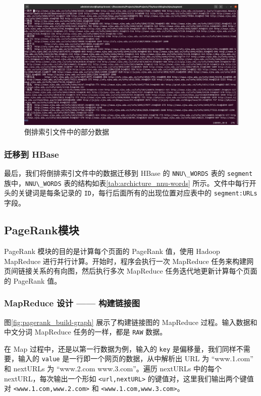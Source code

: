 \documentclass{ctexart}
\newcommand{\code}[1]{\colorbox{backcolor}{\lstinline|#1|}}
\begin{document}
    \begin{figure}[t]
        \centering
        \includegraphics[width=\textwidth]{src/segment_rows}
        \caption{倒排索引文件中的部分数据}
        \label{fig:segment_rows}
    \end{figure}

    \subsubsection{迁移到 HBase}\label{subsubsec:segment_migrate}

    最后，我们将倒排索引文件中的数据迁移到 HBase 的 \code{NNU\_WORDS} 表的 \code{segment} 族中，\code{NNU\_WORDS} 表的结构如表\ref{tab:archicture_nnu-words} 所示。文件中每行开头的关键词是每条记录的 \code{ID}，每行后面所有的出现位置对应表中的 \code{segment:URLs} 字段。

    \subsection{PageRank模块}\label{subsec:pagerank}

    PageRank 模块的目的是计算每个页面的 PageRank 值，使用 Hadoop MapReduce 进行并行计算。开始时，程序会执行一次 MapReduce 任务来构建网页间链接关系的有向图，然后执行多次 MapReduce 任务迭代地更新计算每个页面的 PageRank 值。

    \subsubsection{MapReduce 设计 —— 构建链接图}\label{subsubsec:pagerank_build}

    图\ref{fig:pagerank_build-graph} 展示了构建链接图的 MapReduce 过程。输入数据和中文分词 MapReduce 任务的一样，都是 \code{RAW} 数据。

    在 Map 过程中，还是以第一行数据为例，输入的 \code{key} 是偏移量，我们同样不需要，输入的 \code{value} 是一行即一个网页的数据，从中解析出 URL 为 “www.1.com” 和 nextURLs 为 “www.2.com www.3.com”。遍历 nextURLs 中的每个 nextURL，每次输出一个形如 \code{<url,nextURL>} 的键值对，这里我们输出两个键值对 \code{<www.1.com,www.2.com>} 和 \code{<www.1.com,www.3.com>}。
\end{document}
